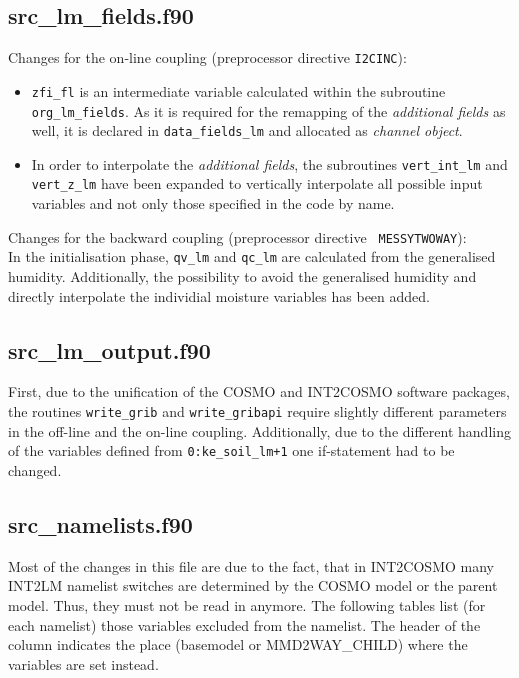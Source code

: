 \documentclass[11pt,twoside]{article}
\begin{document}
\subsection{src\_lm\_fields.f90}
Changes for the on-line coupling (preprocessor directive {\tt \large I2CINC}):
\begin{itemize}
\item \verb|zfi_fl| is an intermediate variable calculated within the subroutine
\verb|org_lm_fields|. As it is required for the remapping of the {\it 
additional fields} as well, it is declared in \verb|data_fields_lm| and 
allocated as {\it channel object}.
\item In order to interpolate the {\it additional fields}, the subroutines 
\verb|vert_int_lm| and \verb|vert_z_lm| have been expanded
to vertically interpolate all possible input variables and not only those 
specified in the code by name. 
\end{itemize}
Changes for the backward coupling (preprocessor directive {\tt \large
MESSYTWOWAY}):\\
In the initialisation phase, 
\verb|qv_lm| and \verb|qc_lm| are calculated from the generalised
humidity. Additionally, the possibility to avoid the generalised
humidity and directly interpolate the individial moisture variables
has been added.

\subsection{src\_lm\_output.f90}
First, due to the unification of the COSMO and INT2COSMO software
packages, the routines \verb|write_grib| and  \verb|write_gribapi|
require slightly different parameters in the off-line and the on-line
coupling. 
Additionally, due to the different handling of the variables defined
from \verb|0:ke_soil_lm+1| one if-statement had to be changed.

\subsection{src\_namelists.f90}
Most of the changes in this file are due to the fact, that in INT2COSMO
 many INT2LM namelist switches are determined by the COSMO model or
 the parent model. 
Thus, they must not be read in anymore. The following tables list 
(for each namelist) those variables excluded from the namelist. The header of the
column indicates the place (basemodel or MMD2WAY\_CHILD) where the variables are set 
instead.
\end{document}
